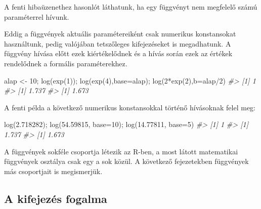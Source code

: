 \documentclass[
]{book}
\newenvironment{Shaded}{\begin{snugshade}}{\end{snugshade}}
\newcommand{\AttributeTok}[1]{\textcolor[rgb]{0.77,0.63,0.00}{#1}}
\newcommand{\CommentTok}[1]{\textcolor[rgb]{0.56,0.35,0.01}{\textit{#1}}}
\newcommand{\DecValTok}[1]{\textcolor[rgb]{0.00,0.00,0.81}{#1}}
\newcommand{\FloatTok}[1]{\textcolor[rgb]{0.00,0.00,0.81}{#1}}
\newcommand{\FunctionTok}[1]{\textcolor[rgb]{0.00,0.00,0.00}{#1}}
\newcommand{\NormalTok}[1]{#1}
\newcommand{\OtherTok}[1]{\textcolor[rgb]{0.56,0.35,0.01}{#1}}
\newcommand{\SpecialCharTok}[1]{\textcolor[rgb]{0.00,0.00,0.00}{#1}}
\begin{document}
A fenti hibaüzenethez hasonlót láthatunk, ha egy függvényt nem megfelelő számú paraméterrel hívunk.

Eddig a függvények aktuális paramétereiként csak numerikus konstansokat használtunk, pedig valójában tetszőleges kifejezéseket is megadhatunk. A függvény hívása előtt ezek kiértékelődnek és a hívás során ezek az értékek rendelődnek a formális paraméterekhez.

\begin{Shaded}
\begin{Highlighting}[]
\NormalTok{alap }\OtherTok{\textless{}{-}} \DecValTok{10}\NormalTok{; }\FunctionTok{log}\NormalTok{(}\FunctionTok{exp}\NormalTok{(}\DecValTok{1}\NormalTok{)); }\FunctionTok{log}\NormalTok{(}\FunctionTok{exp}\NormalTok{(}\DecValTok{4}\NormalTok{),}\AttributeTok{base=}\NormalTok{alap); }\FunctionTok{log}\NormalTok{(}\DecValTok{2}\SpecialCharTok{*}\FunctionTok{exp}\NormalTok{(}\DecValTok{2}\NormalTok{),}\AttributeTok{b=}\NormalTok{alap}\SpecialCharTok{/}\DecValTok{2}\NormalTok{)}
\CommentTok{\#\textgreater{} [1] 1}
\CommentTok{\#\textgreater{} [1] 1.737}
\CommentTok{\#\textgreater{} [1] 1.673}
\end{Highlighting}
\end{Shaded}

A fenti példa a következő numerikus konstansokkal történő hívásoknak felel meg:

\begin{Shaded}
\begin{Highlighting}[]
\FunctionTok{log}\NormalTok{(}\FloatTok{2.718282}\NormalTok{); }\FunctionTok{log}\NormalTok{(}\FloatTok{54.59815}\NormalTok{, }\AttributeTok{base=}\DecValTok{10}\NormalTok{); }\FunctionTok{log}\NormalTok{(}\FloatTok{14.77811}\NormalTok{, }\AttributeTok{base=}\DecValTok{5}\NormalTok{)}
\CommentTok{\#\textgreater{} [1] 1}
\CommentTok{\#\textgreater{} [1] 1.737}
\CommentTok{\#\textgreater{} [1] 1.673}
\end{Highlighting}
\end{Shaded}

A függvények sokféle csoportja létezik az R-ben, a most látott matematikai függvények osztálya csak egy a sok közül. A következő fejezetekben függvények más csoportjait is megismerjük.

\hypertarget{a-kifejezuxe9s-fogalma}{%
\subsection{A kifejezés fogalma}\label{a-kifejezuxe9s-fogalma}}
\end{document}
